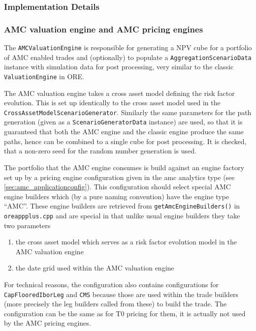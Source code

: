 \documentclass[12pt, a4paper]{article}
\begin{document}
{\begin{appendix}
\subsubsection{Implementation Details}\label{sec:implementation_details}

\subsubsection*{AMC valuation engine and AMC pricing engines}

The \verb+AMCValuationEngine+ is responsible for generating a NPV cube for a portfolio of AMC enabled trades and
(optionally) to populate a \verb+AggregationScenarioData+ instance with simulation data for post processing, very
similar to the classic \verb+ValuationEngine+ in ORE.

The AMC valuation engine takes a cross asset model defining the risk factor evolution. This is set up identically to the
cross asset model used in the \\ \verb+CrossAssetModelScenarioGenerator+. Similarly the same parameters for the path
generation (given as a \verb+ScenarioGeneratorData+ instance) are used, so that it is guaranteed that both the AMC
engine and the classic engine produce the same paths, hence can be combined to a single cube for post processing. It is
checked, that a non-zero seed for the random number generation is used.

The portfolio that the AMC engine consumes is build against an engine factory set up by a pricing engine configuration
given in the amc analytics type (see \ref{sec:amc_applicationconfig}). This configuration should select special AMC engine
builders which (by a pure naming convention) have the engine type ``AMC''. These engine builders are retrieved from
\verb+getAmcEngineBuilders()+ in \verb+oreappplus.cpp+ and are special in that unlike usual engine builders they take
two parameters

\begin{enumerate}
\item the cross asset model which serves as a risk factor evolution model in the AMC valuation engine
\item the date grid used within the AMC valuation engine
\end{enumerate}

For technical reasons, the configuration also contains configurations for \\ \verb+CapFlooredIborLeg+ and \verb+CMS+
because those are used within the trade builders (more precisely the leg builders called from these) to build the
trade. The configuration can be the same as for T0 pricing for them, it is actually not used by the AMC pricing engines.


\end{appendix}}
\end{document}
